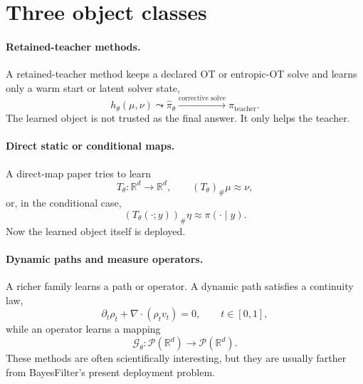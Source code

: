 \documentclass[11pt]{report}
\newcommand{\R}{\mathbb{R}}
\newcommand{\calP}{\mathcal{P}}
\newcommand{\pushf}[2]{\left(#1\right)_{\#} #2}
\begin{document}
\section{Three object classes}

\paragraph{Retained-teacher methods.}
A retained-teacher method keeps a declared OT or entropic-OT solve and learns only
a warm start or latent solver state,
\begin{equation}
h_\theta(\mu,\nu)
\leadsto
\widehat \pi_\theta
\xrightarrow{\text{corrective solve}}
\pi_{\mathrm{teacher}}.
\label{eq:retained-teacher-schema}
\end{equation}
The learned object is not trusted as the final answer.  It only helps the teacher.

\paragraph{Direct static or conditional maps.}
A direct-map paper tries to learn
\begin{equation}
T_\theta : \R^d \to \R^d,
\qquad
\pushf{T_\theta}{\mu} \approx \nu,
\label{eq:direct-map-schema}
\end{equation}
or, in the conditional case,
\begin{equation}
\pushf{T_\theta(\cdot;y)}{\eta} \approx \pi(\cdot\mid y).
\label{eq:conditional-map-schema}
\end{equation}
Now the learned object itself is deployed.

\paragraph{Dynamic paths and measure operators.}
A richer family learns a path or operator.  A dynamic path satisfies a continuity
law,
\begin{equation}
\partial_t \rho_t + \nabla\cdot(\rho_t v_t)=0,
\qquad
t\in[0,1],
\label{eq:continuity-path}
\end{equation}
while an operator learns a mapping
\begin{equation}
\mathcal G_\theta : \calP(\R^d) \to \calP(\R^d).
\label{eq:measure-operator}
\end{equation}
These methods are often scientifically interesting, but they are usually farther
from BayesFilter's present deployment problem.
\end{document}
